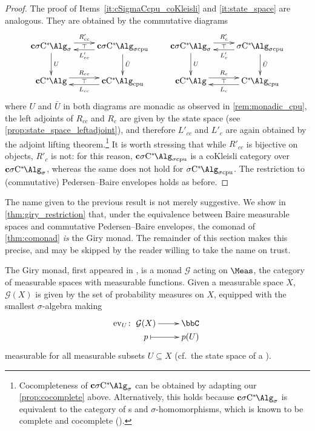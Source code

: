 \begin{proof}
	The proof of Items~\ref{it:cSigmaCcpu_coKleisli} and \ref{it:state_space} are analogous.
	They are obtained by the commutative diagrams
	\[
		\vxy{
		\cSigmaC\ar@<.4em>[r]^-{R'_{cc}}\ar@{<-}@<-.4em>[r]_-{L'_{cc}}\ar@{}[r]|-\top \ar[d]^U & \cSigmaCcpu \ar[d]^{\bar{U}}\\
		\cCalg \ar@<.4em>[r]^-{R_{cc}}\ar@{<-}@<-.4em>[r]_-{L_{cc}}\ar@{}[r]|-\top & \cCalgcpu} \qquad \vxy{
		\cSigmaC\ar@<.4em>[r]^-{R'_c}\ar@{<-}@<-.4em>[r]_-{L'_c}\ar@{}[r]|-\top \ar[d]^U & \SigmaCcpu \ar[d]^{\bar{U}}\\
		\cCalg \ar@<.4em>[r]^-{R_c}\ar@{<-}@<-.4em>[r]_-{L_c}\ar@{}[r]|-\top & \Calgcpu}
	\]
	where $U$ and $\bar{U}$ in both diagrams are monadic as observed in \cref{rem:monadic_cpu}, the left adjoints of $R_{cc}$ and $R_c$ are given by the state space (see \cref{prop:state_space_leftadjoint}), and therefore $L'_{cc}$ and $L'_c$ are again obtained by the adjoint lifting theorem.\footnote{Cocompleteness of $\cSigmaC$ can be obtained by adapting our \cref{prop:cocomplete} above. Alternatively, this holds because $\cSigmaC$ is equivalent to the category of \bsigma{}s and $\sigma$-homomorphisms, which is known to be complete and cocomplete (\cite[Remark 2.1.12]{fritz2025categories}). }
	It is worth stressing that while $R'_{cc}$ is bijective on objects, $R'_c$ is not: for this reason, $\cSigmaCcpu$ is a coKleisli category over $\cSigmaC$, whereas the same does not hold for $\SigmaCcpu$.
	The restriction to (commutative) Pedersen--Baire envelopes holds as before.
\end{proof}
	The name given to the previous result is not merely suggestive.
	We show in \cref{thm:giry_restriction} that, under the equivalence between Baire measurable spaces and commutative Pedersen--Baire envelopes, the comonad of \cref{thm:comonad} \emph{is} the Giry monad.
	The remainder of this section makes this precise, and may be skipped by the reader willing to take the name on trust.

The Giry monad, first appeared in \cite{giry82probability}, is a monad $\mathcal{G}$ acting on $\Meas$, the category of measurable spaces with measurable functions.
Given a measurable space $X$, $\mathcal{G}(X)$ is given by the set of probability measures on $X$, equipped with the smallest $\sigma$-algebra making
\[
	\ev_U \colon \xymatrix@R=0pt{
	\mathcal{G}(X) \ar[r]
	& \bbC \\
	p  \ar@{|->}[r]
	& p(U)
	}
\]
measurable for all measurable subsets $U\subseteq X$ (cf.\ the state space of a \cstar{}).

